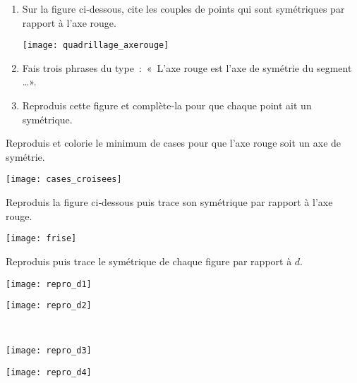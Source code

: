 \begin{exercice}
\begin{enumerate}
 \item Sur la figure ci‑dessous, cite les couples de points qui sont symétriques par rapport à l'axe rouge. \\[0.3em]
 \begin{center} \texttt{[image: quadrillage\_axerouge]} \end{center}
 \item Fais trois phrases du type : « L'axe rouge est l'axe de symétrie du segment \ldots ».
 \item Reproduis cette figure et complète‑la pour que chaque point ait un symétrique.
 \end{enumerate}
\end{exercice}


\begin{exercice}
Reproduis et colorie le minimum de cases pour que l'axe rouge soit un axe de symétrie.
 \begin{center} \texttt{[image: cases\_croisees]} \end{center}
\end{exercice}


\begin{exercice}[Frise]
Reproduis la figure ci‑dessous puis trace son symétrique par rapport à l'axe rouge. 
 \begin{center} \texttt{[image: frise]} \end{center}
\end{exercice}


\begin{exercice}
Reproduis puis trace le symétrique de chaque figure par rapport à $d$.

\begin{minipage}[c]{0.48\linewidth}
 \texttt{[image: repro\_d1]}
 \end{minipage} \hfill%
 \begin{minipage}[c]{0.48\linewidth}
 \texttt{[image: repro\_d2]}
  \end{minipage} \\
 \begin{minipage}[c]{0.48\linewidth}
 \texttt{[image: repro\_d3]}
 \end{minipage} \hfill%
 \begin{minipage}[c]{0.48\linewidth}
 \texttt{[image: repro\_d4]}
 \end{minipage} \\
\end{exercice}


